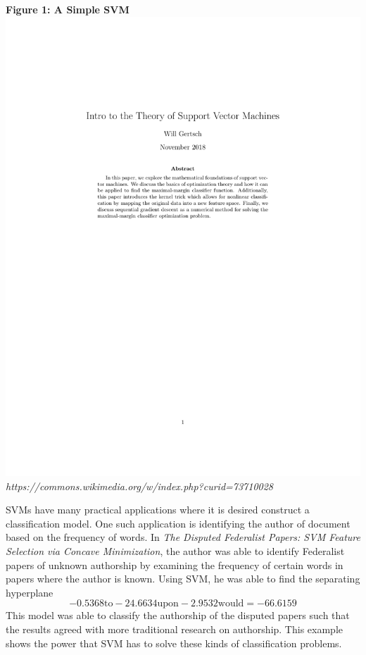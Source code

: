 \documentclass{article}
\begin{document}
\begin{center}
\textbf{Figure 1: A Simple SVM}\\
\includegraphics[scale=2]{svm}
\textit{https://commons.wikimedia.org/w/index.php?curid=73710028}
\end{center}

SVMs have many practical applications where it is desired construct a classification model. One such application is identifying the author of document based on the frequency of words. In \textit{The Disputed Federalist Papers: SVM Feature Selection via Concave Minimization}, the author was able to identify Federalist papers of unknown authorship by examining the frequency of certain words in papers where the author is known. Using SVM, he was able to find the separating hyperplane
$$ -0.5368\text{to} - 24.6634\text{upon} - 2.9532\text{would} = -66.6159$$
This model was able to classify the authorship of the disputed papers such that the results agreed with more traditional research on authorship. This example shows the power that SVM has to solve these kinds of classification problems.
\end{document}
